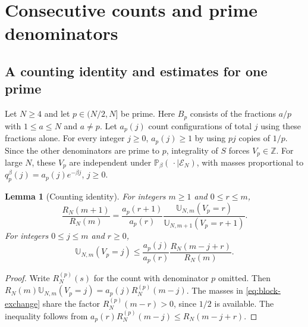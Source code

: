 \documentclass[11pt]{amsart}
\newtheorem{lemma}[theorem]{Lemma}
\theoremstyle{remark}
\newcommand{\Pp}{\mathbb P}
\newcommand{\Z}{\mathbb Z}
\begin{document}
\section{Consecutive counts and prime denominators}
\label{sec:exchange}

\subsection{A counting identity and estimates for one prime}

Let \(N\ge4\) and let \(p\in(N/2,N]\) be prime. Here \(B_p\) consists of
the fractions \(a/p\) with \(1\le a\le N\) and \(a\ne p\). Let \(a_p(j)\)
count configurations of total \(j\) using these fractions alone. For every
integer \(j\ge0\), \(a_p(j)\ge1\) by using \(pj\) copies of \(1/p\).
Since the other denominators are prime to \(p\), integrality of \(S\)
forces \(V_p\in\Z\). For large \(N\), these \(V_p\) are independent under
\(\Pp_\beta(\,\cdot\mid\mathcal E_N)\), with masses proportional to
\(q_p^\beta(j)=a_p(j)e^{-\beta j}\), \(j\ge0\).

\begin{lemma}[Counting identity]
\label{lem:block-exchange}
For integers \(m\ge1\) and \(0\le r\le m\),
\begin{equation}
 \frac{R_N(m+1)}{R_N(m)}
 =\frac{a_p(r+1)}{a_p(r)}
   \frac{\mathbb U_{N,m}(V_p=r)}{\mathbb U_{N,m+1}(V_p=r+1)} .
 \label{eq:block-exchange}
\end{equation}
For integers \(0\le j\le m\) and \(r\ge0\),
\begin{equation}
 \mathbb U_{N,m}(V_p=j)
 \le \frac{a_p(j)}{a_p(r)}\frac{R_N(m-j+r)}{R_N(m)} .
 \label{eq:block-exchange-bound}
\end{equation}
\end{lemma}

\begin{proof}
Write \(R_N^{(p)}(s)\) for the count with denominator \(p\) omitted. Then
\(R_N(m)\mathbb U_{N,m}(V_p=j)=a_p(j)R_N^{(p)}(m-j)\). The masses in
\eqref{eq:block-exchange} share the factor \(R_N^{(p)}(m-r)>0\), since
\(1/2\) is available. The inequality follows from
\(a_p(r)R_N^{(p)}(m-j)\le R_N(m-j+r)\).
\end{proof}
\end{document}
